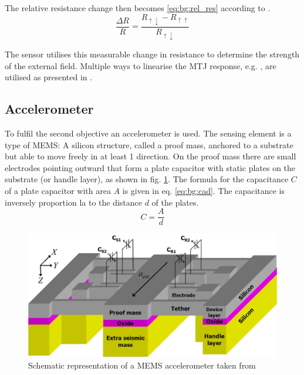 The relative resistance change then becomes \eqref{eq:bg:rel_res} according to \cite{moodera1995}.
\begin{equation}
    \frac{\Delta R}{R}=\frac{R_{\uparrow\downarrow} - R_{\uparrow\uparrow}}{R_{\uparrow\downarrow}}
    \label{eq:bg:rel_res}
\end{equation}

The sensor utilises this measurable change in resistance to determine the strength of the external field. Multiple ways to linearise the \ac{MTJ} response, e.g. , are utilised as presented in \cite{yan2022}.

\subsection{Accelerometer \label{sec:bg:accelerometers}}
To fulfil the second objective an accelerometer is used. The sensing element is a type of \ac{MEMS}: A silicon structure, called a proof mass, anchored to a substrate but able to move freely in at least 1 direction. On the proof mass there are small electrodes pointing outward that form a plate capacitor with static plates on the substrate (or handle layer), as shown in fig. \ref{fig:bg:mems_accelerometer}. The formula for the capacitance $C$ of a plate capacitor with area $A$ is given in eq. \eqref{eq:bg:cad}. The capacitance is inversely proportion la to the distance $d$ of the plates.
\begin{equation}
    C=\frac{A}{d}
    \label{eq:bg:cad}
\end{equation}

\begin{figure}[H]
    \centering
    \includegraphics[width=\linewidth]{images/01_background/mems_acc_diagram.png}
    \caption{Schematic representation of a \ac{MEMS} accelerometer taken from \cite{abdolvand2007}}
    \label{fig:bg:mems_accelerometer}
\end{figure}

